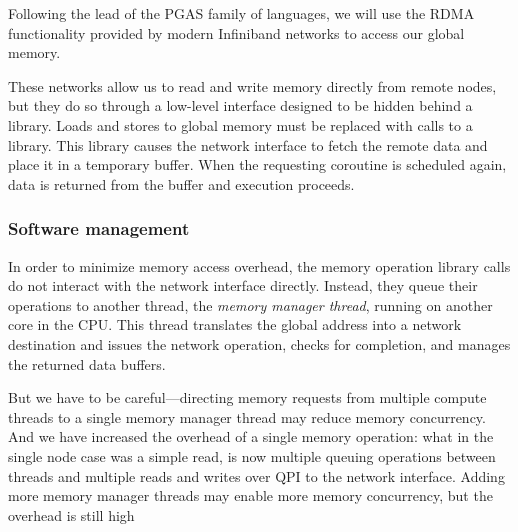 \documentclass{acm_proc_article-sp}
\begin{document}






Following the lead of the PGAS family of languages, we will use
the RDMA functionality provided by modern Infiniband networks to
access our global memory. 

These networks allow us to read and write memory directly from remote
nodes, but they do so through a low-level interface designed to be
hidden behind a library. Loads and stores to global memory must be
replaced with calls to a library. This library causes the network
interface to fetch the remote data and place it in a temporary
buffer. When the requesting coroutine is scheduled again, data is
returned from the buffer and execution proceeds.

\subsubsection{Software management}
In order to minimize memory access overhead, the memory operation
library calls do not interact with the network interface
directly. Instead, they queue their operations to another thread, the
{\em memory manager thread}, running on another core in the CPU. This thread
translates the global address into a network destination and issues
the network operation, checks for completion, and manages the returned
data buffers.

But we have to be careful---directing memory requests from multiple
compute threads to a single memory manager thread may reduce memory
concurrency. And we have increased the overhead of a single memory
operation: what in the single node case was a simple read, is now
multiple queuing operations between threads and multiple reads and
writes over QPI to the network interface. Adding more memory manager
threads may enable more memory concurrency, but the overhead is still high 
\end{document}
